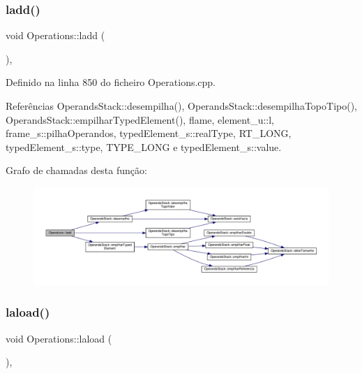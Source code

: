 \subsubsection{\texorpdfstring{ladd()}{ladd()}}
{\footnotesize\ttfamily void Operations\+::ladd (\begin{DoxyParamCaption}{ }\end{DoxyParamCaption})\hspace{0.3cm}{\ttfamily [static]}, {\ttfamily [private]}}



Definido na linha 850 do ficheiro Operations.\+cpp.



Referências Operands\+Stack\+::desempilha(), Operands\+Stack\+::desempilha\+Topo\+Tipo(), Operands\+Stack\+::empilhar\+Typed\+Element(), flame, element\+\_\+u\+::l, frame\+\_\+s\+::pilha\+Operandos, typed\+Element\+\_\+s\+::real\+Type, R\+T\+\_\+\+L\+O\+NG, typed\+Element\+\_\+s\+::type, T\+Y\+P\+E\+\_\+\+L\+O\+NG e typed\+Element\+\_\+s\+::value.

Grafo de chamadas desta função\+:
\nopagebreak
\begin{figure}[H]
\begin{center}
\leavevmode
\includegraphics[width=350pt]{classOperations_ad4b153d687baa98c26fcfe7c24e12f45_cgraph}
\end{center}
\end{figure}
\mbox{\label{classOperations_a064f10825e8f0153ef19d466845d3734}} 
\subsubsection{\texorpdfstring{laload()}{laload()}}
{\footnotesize\ttfamily void Operations\+::laload (\begin{DoxyParamCaption}{ }\end{DoxyParamCaption})\hspace{0.3cm}{\ttfamily [static]}, {\ttfamily [private]}}



